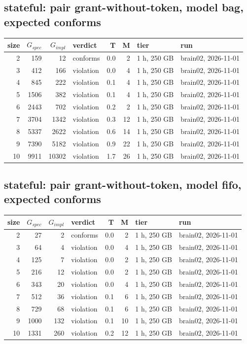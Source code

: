 \documentclass[10pt]{article}
\begin{document}
\subsection*{stateful: pair \textsf{grant-without-token}, model bag, expected conforms}
\begin{longtable}{@{}rrrlrrll@{}}
\toprule
size & $G_{\mathit{spec}}$ & $G_{\mathit{impl}}$ & verdict & T & M & tier & run \\
\midrule
\endhead
\color{blue} 2 & 159 & 12 & conforms & 0.0 & 2 & 1 h, 250 GB & brain02, 2026-11-01 \\
\color{blue} 3 & 412 & 166 & violation & 0.0 & 4 & 1 h, 250 GB & brain02, 2026-11-01 \\
\color{blue} 4 & 845 & 222 & violation & 0.1 & 4 & 1 h, 250 GB & brain02, 2026-11-01 \\
\color{blue} 5 & 1506 & 382 & violation & 0.1 & 4 & 1 h, 250 GB & brain02, 2026-11-01 \\
\color{blue} 6 & 2443 & 702 & violation & 0.2 & 2 & 1 h, 250 GB & brain02, 2026-11-01 \\
\color{blue} 7 & 3704 & 1342 & violation & 0.3 & 12 & 1 h, 250 GB & brain02, 2026-11-01 \\
\color{blue} 8 & 5337 & 2622 & violation & 0.6 & 14 & 1 h, 250 GB & brain02, 2026-11-01 \\
\color{blue} 9 & 7390 & 5182 & violation & 0.9 & 22 & 1 h, 250 GB & brain02, 2026-11-01 \\
\color{blue} 10 & 9911 & 10302 & violation & 1.7 & 26 & 1 h, 250 GB & brain02, 2026-11-01 \\
\bottomrule
\end{longtable}
\subsection*{stateful: pair \textsf{grant-without-token}, model fifo, expected conforms}
\begin{longtable}{@{}rrrlrrll@{}}
\toprule
size & $G_{\mathit{spec}}$ & $G_{\mathit{impl}}$ & verdict & T & M & tier & run \\
\midrule
\endhead
\color{blue} 2 & 27 & 2 & conforms & 0.0 & 2 & 1 h, 250 GB & brain02, 2026-11-01 \\
\color{blue} 3 & 64 & 4 & violation & 0.0 & 4 & 1 h, 250 GB & brain02, 2026-11-01 \\
\color{blue} 4 & 125 & 7 & violation & 0.0 & 2 & 1 h, 250 GB & brain02, 2026-11-01 \\
\color{blue} 5 & 216 & 12 & violation & 0.0 & 2 & 1 h, 250 GB & brain02, 2026-11-01 \\
\color{blue} 6 & 343 & 20 & violation & 0.0 & 4 & 1 h, 250 GB & brain02, 2026-11-01 \\
\color{blue} 7 & 512 & 36 & violation & 0.1 & 6 & 1 h, 250 GB & brain02, 2026-11-01 \\
\color{blue} 8 & 729 & 68 & violation & 0.1 & 6 & 1 h, 250 GB & brain02, 2026-11-01 \\
\color{blue} 9 & 1000 & 132 & violation & 0.1 & 10 & 1 h, 250 GB & brain02, 2026-11-01 \\
\color{blue} 10 & 1331 & 260 & violation & 0.2 & 12 & 1 h, 250 GB & brain02, 2026-11-01 \\
\bottomrule
\end{longtable}
\end{document}
